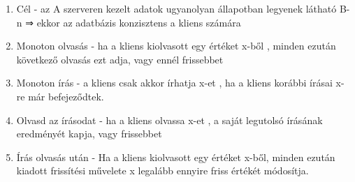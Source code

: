 \documentclass[twoside, a4paper, 12pt]{article}
\begin{document}
\begin{enumerate}
    \item Cél
        - az A szerveren kezelt adatok ugyanolyan állapotban legyenek látható B-n ⇒ ekkor az adatbázis konzisztens a kliens számára
    \item Monoton olvasás
        - ha a kliens kiolvasott egy értéket x-ből , minden ezután következő olvasás ezt adja, vagy ennél frissebbet
    \item Monoton írás
        - a kliens csak akkor írhatja x-et , ha a kliens korábbi írásai x-re már befejeződtek.
    \item Olvasd az írásodat
        - ha a kliens olvassa x-et , a saját legutolsó írásának eredményét kapja, vagy frissebbet
    \item Írás olvasás után
        - Ha a kliens kiolvasott egy értéket x-ből, minden ezután kiadott frissítési művelete x legalább ennyire friss értékét módosítja.
\end{enumerate}
\end{document}
